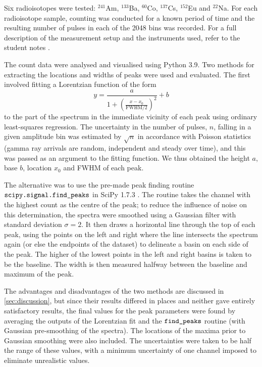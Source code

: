 \documentclass[twocol]{ametsocV6.1}
\begin{document}
Six radioisotopes were tested: $^{241}$Am, $^{133}$Ba, $^{60}$Co, $^{137}$Cs,
$^{152}$Eu and $^{22}$Na. For each radioisotope sample, counting was conducted
for a known period of time and the resulting number of pulses in each of the
2048 bins was recorded. For a full description of the measurement setup
and the instruments used, refer to the student notes \citep{notes}.

The count data were analysed and visualised using Python 3.9. Two methods
for extracting the locations and widths of peaks were used and evaluated.
The first involved fitting a Lorentzian function of the form
\begin{equation}
	y =\frac{a}{1 + \left( \frac{x - x_0}{\mathrm{FWHM}/2} \right)^2} + b
	\label{lorentzian}
\end{equation}
to the part of the spectrum in the immediate vicinity of each peak
using ordinary least-squares regression.
The uncertainty in the number of pulses, $n$, falling in a given
amplitude bin was estimated by $\sqrt{n}$ in accordance with Poisson
statistics (gamma ray arrivals are random, independent and steady over time),
and this was passed as an argument to the fitting function.
We thus obtained the height $a$, base $b$, location $x_0$ and FWHM of each peak.

The alternative was to use the pre-made peak finding routine
$\verb|scipy.signal.find_peaks|$ in SciPy 1.7.3 \citep{scipy}. The routine
takes the channel with the highest count as the centre of the peak;
to reduce the influence of noise on this determination, the spectra were
smoothed using a Gaussian filter with standard deviation $\sigma = 2$.
It then draws a horizontal line through the top of each peak,
using the points on the left and right where the line intersects
the spectrum again (or else the endpoints of the dataset) to delineate
a basin on each side of the peak. The higher of the lowest points in the left
and right basins is taken to be the baseline.
The width is then measured halfway between the baseline and maximum of the peak.

The advantages and disadvantages of the two methods are discussed in
\autoref{sec:discussion}, but since their results differed in places and
neither gave entirely satisfactory results, the final values for the peak
parameters were found by averaging the outputs of the Lorentzian fit and
the $\verb|find_peaks|$ routine (with Gaussian pre-smoothing of the spectra).
The locations of the maxima prior to Gaussian smoothing were also included.
The uncertainties were taken
to be half the range of these values, with a minimum uncertainty of one
channel imposed to eliminate unrealistic values.
\end{document}
